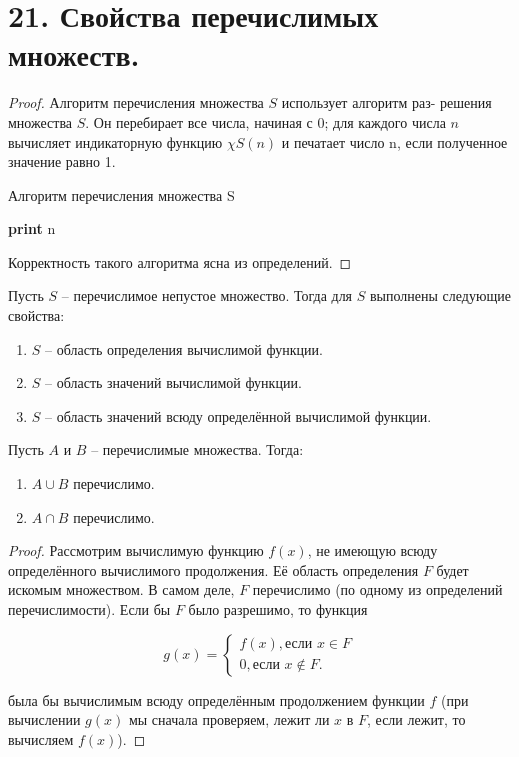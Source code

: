 \section*{21. Свойства перечислимых множеств.}


\begin{proof}
	Алгоритм перечисления множества $S$ использует алгоритм раз-
	решения множества $S$. Он перебирает все числа, начиная с 0; для каждого числа
	$n$ вычисляет индикаторную функцию $\chi S(n)$ и печатает число n, если полученное
	значение равно 1.
	
	\begin{algorithm}
		\caption{Алгоритм перечисления множества S}
		\begin{algorithmic}[1]
			\State \textbf{print} n
			\EndIf
			\EndFor
			\EndFunction
		\end{algorithmic}
	\end{algorithm}
	
	Корректность такого алгоритма ясна из определений.
\end{proof}

Пусть $S$ -- перечислимое непустое множество. Тогда для $S$ выполнены следующие свойства:

\begin{enumerate}
	\item $S$ -- область определения вычислимой функции.
	\item $S$ -- область значений вычислимой функции.
	\item $S$ -- область значений всюду определённой вычислимой функции.
\end{enumerate}

Пусть $A$ и $B$ -- перечислимые множества. Тогда:

\begin{enumerate}
	\item $A \cup B$ перечислимо.
	\item $A \cap B$ перечислимо.
\end{enumerate}


\begin{proof}
	Рассмотрим вычислимую функцию $f(x)$, не имеющую всюду определённого вычислимого продолжения. Её область определения $F$ будет искомым множеством. В самом деле, $F$ перечислимо (по одному из определений перечислимости). Если бы $F$ было разрешимо, то функция
	
	\[
	g(x) =
	\begin{cases}
	f(x), \text{если $x \in F$} \\
	0, \text{если  $x \notin F$}.
	\end{cases}
	\]
	
	была бы вычислимым всюду определённым продолжением функции $f$ (при вычислении $g(x)$ мы сначала проверяем, лежит ли $x$ в $F$, если лежит, то вычисляем $f(x)$).
\end{proof}


